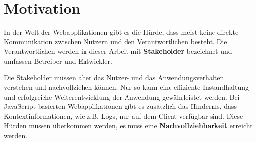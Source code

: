 \section{Motivation}


In der Welt der Webapplikationen gibt es die Hürde, dass meist keine direkte Kommunikation zwischen Nutzern und den Verantwortlichen besteht. Die Verantwortlichen werden in dieser Arbeit mit \textbf{Stakeholder} bezeichnet und umfassen Betreiber und Entwickler.

Die Stakeholder müssen aber das Nutzer- und das Anwendungsverhalten verstehen und nachvollziehen können. Nur so kann eine effiziente Instandhaltung und erfolgreiche Weiterentwicklung der Anwendung gewährleistet werden. Bei JavaScript-basierten Webapplikationen gibt es zusätzlich das Hindernis, dass Kontextinformationen, wie z.B. Logs, nur auf dem Client verfügbar sind. Diese Hürden müssen überkommen werden, es muss eine \textbf{Nachvollziehbarkeit} erreicht werden.


%

